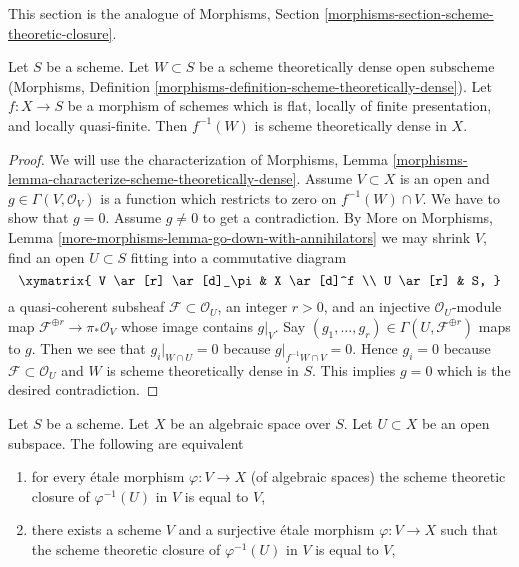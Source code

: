 \noindent
This section is the analogue of
Morphisms, Section \ref{morphisms-section-scheme-theoretic-closure}.

\begin{lemma}
\label{lemma-scheme-theoretically-dense-representable}
Let $S$ be a scheme. Let $W \subset S$ be a scheme theoretically
dense open subscheme
(Morphisms, Definition \ref{morphisms-definition-scheme-theoretically-dense}).
Let $f : X \to S$ be a morphism of schemes which is flat, locally of
finite presentation, and locally quasi-finite.
Then $f^{-1}(W)$ is scheme theoretically dense in $X$.
\end{lemma}

\begin{proof}
We will use the characterization of Morphisms, Lemma
\ref{morphisms-lemma-characterize-scheme-theoretically-dense}.
Assume $V \subset X$ is an open and $g \in \Gamma(V, \mathcal{O}_V)$
is a function which restricts to zero on $f^{-1}(W) \cap V$.
We have to show that $g = 0$. Assume $g \not = 0$ to get a
contradiction. By
More on Morphisms, Lemma \ref{more-morphisms-lemma-go-down-with-annihilators}
we may shrink $V$, find an open $U \subset S$ fitting into a
commutative diagram
$$
\xymatrix{
V \ar[r] \ar[d]_\pi & X \ar[d]^f \\
U \ar[r] & S,
}
$$
a quasi-coherent subsheaf $\mathcal{F} \subset \mathcal{O}_U$, an integer
$r > 0$, and an injective $\mathcal{O}_U$-module map
$\mathcal{F}^{\oplus r} \to \pi_*\mathcal{O}_V$
whose image contains $g|_V$. Say
$(g_1, \ldots, g_r) \in \Gamma(U, \mathcal{F}^{\oplus r})$ maps to $g$.
Then we see that $g_i|_{W \cap U} = 0$ because $g|_{f^{-1}W \cap V} = 0$.
Hence $g_i = 0$ because $\mathcal{F} \subset \mathcal{O}_U$ and
$W$ is scheme theoretically dense in $S$.
This implies $g = 0$ which is the desired contradiction.
\end{proof}

\begin{lemma}
\label{lemma-scheme-theoretically-dense}
Let $S$ be a scheme.
Let $X$ be an algebraic space over $S$.
Let $U \subset X$ be an open subspace.
The following are equivalent
\begin{enumerate}
\item for every \'etale morphism $\varphi : V \to X$ (of algebraic spaces)
the scheme theoretic closure of $\varphi^{-1}(U)$ in $V$ is equal to $V$,
\item there exists a scheme $V$ and a surjective \'etale morphism
$\varphi : V \to X$ such that the scheme theoretic closure of
$\varphi^{-1}(U)$ in $V$ is equal to $V$,
\end{enumerate}
\end{lemma}

